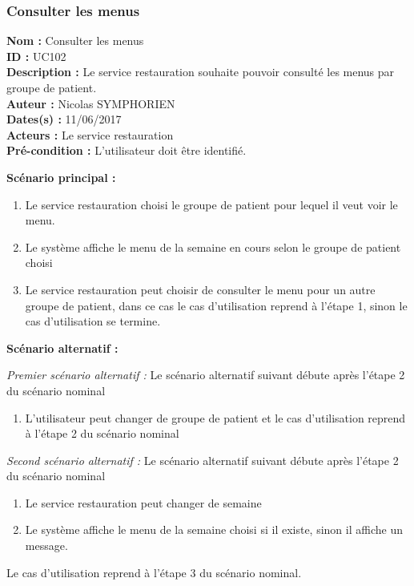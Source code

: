 \subsubsection{Consulter les menus}

\noindent\textbf{Nom :} Consulter les menus \\
\textbf{ID :} UC102 \\
\textbf{Description :} Le service restauration souhaite pouvoir consulté les menus par groupe de patient. \\
\textbf{Auteur :} Nicolas SYMPHORIEN \\
\textbf{Dates(s) :} 11/06/2017 \\
\textbf{Acteurs :} Le service restauration \\
\textbf{Pré-condition :} L'utilisateur doit être identifié.

\noindent \textbf{Scénario principal :}

\begin{enumerate}
	\item Le service restauration choisi le groupe de patient pour lequel il veut voir le menu.
	\item Le système affiche le menu de la semaine en cours selon le groupe de patient choisi
	\item Le service restauration peut choisir de consulter le menu pour un autre groupe de patient, dans ce cas le cas d'utilisation reprend à l'étape 1, sinon le cas d'utilisation se termine.
\end{enumerate}

\noindent \textbf{Scénario alternatif :}

\textit{Premier scénario alternatif :}
Le scénario alternatif suivant débute après l'étape 2 du scénario nominal
\begin{enumerate}
	\item L'utilisateur peut changer de groupe de patient et le cas d'utilisation reprend à l'étape 2 du scénario nominal
\end{enumerate}

\textit{Second scénario alternatif :}
Le scénario alternatif suivant débute après l'étape 2 du scénario nominal
\begin{enumerate}
	\item Le service restauration peut changer de semaine
	\item Le système affiche le menu de la semaine choisi si il existe, sinon il affiche un message. 
\end{enumerate}
Le cas d'utilisation reprend à l'étape 3 du scénario nominal.

